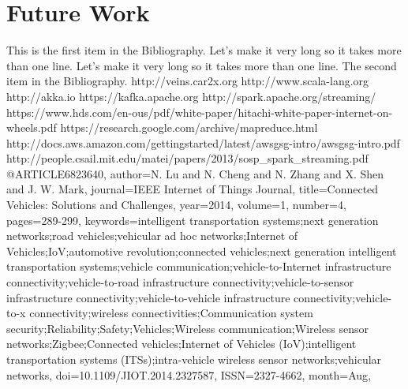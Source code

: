 \documentclass{thesis}
\begin{document}
\section{Future Work}


\begin{singlespace}
\begin{thebibliography}{99}
 This is the first item in the Bibliography.
Let's make it very long so it takes more than one line.
Let's make it very long so it takes more than one line.
 The second item in the Bibliography.
    http://veins.car2x.org %
    http://www.scala-lang.org %
    http://akka.io %
    https://kafka.apache.org %
    http://spark.apache.org/streaming/ %
    https://www.hds.com/en-ous/pdf/white-paper/hitachi-white-paper-internet-on-wheels.pdf
    https://research.google.com/archive/mapreduce.html
    http://docs.aws.amazon.com/gettingstarted/latest/awsgsg-intro/awsgsg-intro.pdf %
    http://people.csail.mit.edu/matei/papers/2013/sosp\_spark\_streaming.pdf %
    @ARTICLE{6823640, 
        author={N. Lu and N. Cheng and N. Zhang and X. Shen and J. W. Mark}, 
        journal={IEEE Internet of Things Journal}, 
        title={Connected Vehicles: Solutions and Challenges}, 
        year={2014}, 
        volume={1}, 
        number={4}, 
        pages={289-299}, 
        keywords={intelligent transportation systems;next generation networks;road vehicles;vehicular ad hoc networks;Internet of Vehicles;IoV;automotive revolution;connected vehicles;next generation intelligent transportation systems;vehicle communication;vehicle-to-Internet infrastructure connectivity;vehicle-to-road infrastructure connectivity;vehicle-to-sensor infrastructure connectivity;vehicle-to-vehicle infrastructure connectivity;vehicle-to-x connectivity;wireless
        connectivities;Communication system security;Reliability;Safety;Vehicles;Wireless communication;Wireless sensor networks;Zigbee;Connected vehicles;Internet of Vehicles (IoV);intelligent transportation systems (ITSs);intra-vehicle wireless sensor networks;vehicular networks}, 
        doi={10.1109/JIOT.2014.2327587}, 
        ISSN={2327-4662}, 
        month={Aug},}

\end{thebibliography}
\end{singlespace}
\end{document}
